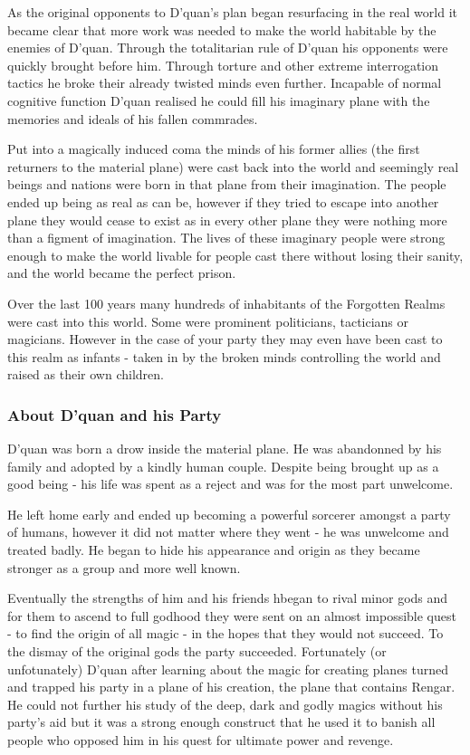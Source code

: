 \documentclass[10pt,twoside,twocolumn]{article}
\begin{document}
As the original opponents to D'quan's plan began resurfacing in the real world it became clear that more work was needed to make the world habitable by the enemies of D'quan. Through the totalitarian rule of D'quan his opponents were quickly brought before him. Through torture and other extreme interrogation tactics he broke their already twisted minds even further. Incapable of normal cognitive function D'quan realised he could fill his imaginary plane with the memories and ideals of his fallen commrades.

Put into a magically induced coma the minds of his former allies (the first returners to the material plane) were cast back into the world and seemingly real beings and nations were born in that plane from their imagination. The people ended up being as real as can be, however if they tried to escape into another plane they would cease to exist as in every other plane they were nothing more than a figment of imagination. The lives of these imaginary people were strong enough to make the world livable for people cast there without losing their sanity, and the world became the perfect prison.

Over the last 100 years many hundreds of inhabitants of the Forgotten Realms were cast into this world. Some were prominent politicians, tacticians or magicians. However in the case of your party they may even have been cast to this realm as infants - taken in by the broken minds controlling the world and raised as their own children.

\subsubsection{About D'quan and his Party}
D'quan was born a drow inside the material plane. He was abandonned by his family and adopted by a kindly human couple. Despite being brought up as a good being - his life was spent as a reject and was for the most part unwelcome.

He left home early and ended up becoming a powerful sorcerer amongst a party of humans, however it did not matter where they went - he was unwelcome and treated badly. He began to hide his appearance and origin as they became stronger as a group and more well known.

Eventually the strengths of him and his friends hbegan to rival minor gods and for them to ascend to full godhood they were sent on an almost impossible quest - to find the origin of all magic - in the hopes that they would not succeed. To the dismay of the original gods the party succeeded. Fortunately (or unfotunately) D'quan after learning about the magic for creating planes turned and trapped his party in a plane of his creation, the plane that contains Rengar. He could not further his study of the deep, dark and godly magics without his party's aid but it was a strong enough construct that he used it to banish all people who opposed him in his quest for ultimate power and revenge.
\end{document}
